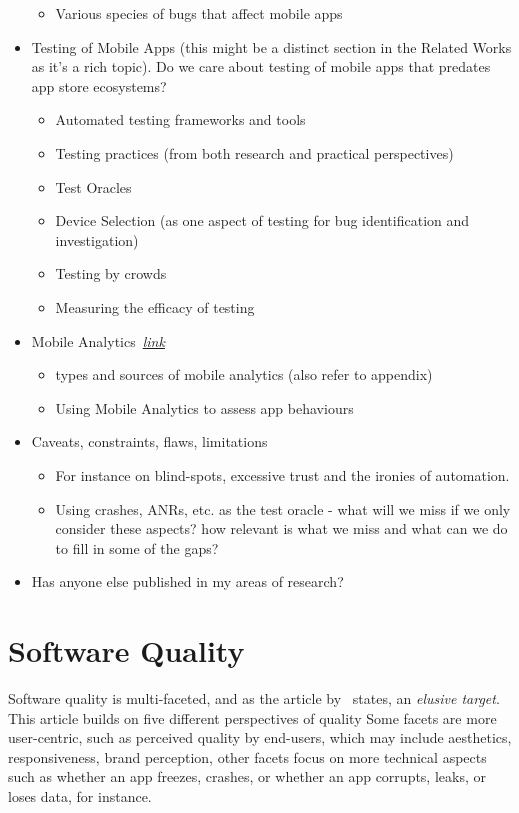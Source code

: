\begin{itemize}
\begin{itemize}
        \item Various species of bugs that affect mobile apps
    \end{itemize}
    \item Testing of Mobile Apps (this might be a distinct section in the Related Works as it's a rich topic). Do we care about testing of mobile apps that predates app store ecosystems?
    \begin{itemize}
        \item Automated testing frameworks and tools
        \item Testing practices (from both research and practical perspectives)
        \item Test Oracles
        \item Device Selection (as one aspect of testing for bug identification and investigation)
        \item Testing by crowds
        \item Measuring the efficacy of testing
    \end{itemize}
    \item Mobile Analytics~\hyperlink{mobile.analytics}{\emph{link}}
    \begin{itemize}
        \item types and sources of mobile analytics (also refer to appendix)
        \item Using Mobile Analytics to assess app behaviours
    \end{itemize}
    \item Caveats, constraints, flaws, limitations
    \begin{itemize}
        \item For instance on blind-spots, excessive trust and the ironies of automation. 
        \item Using crashes, ANRs, etc. as the test oracle - what will we miss if we only consider these aspects? how relevant is what we miss and what can we do to fill in some of the gaps?
    \end{itemize}
    \item Has anyone else published in my areas of research?
\end{itemize}

\hypertarget{software.quality}{}
\section{Software Quality}
Software quality is multi-faceted, and as the article by~\citep{kitchenham1996_software_quality_elusive_target} states, an \emph{elusive target}. This article builds on five different perspectives of quality Some facets are more user-centric, such as perceived quality by end-users, which may include aesthetics, responsiveness, brand perception, other facets focus on more technical aspects such as whether an app freezes, crashes, or whether an app corrupts, leaks, or loses data, for instance. 


